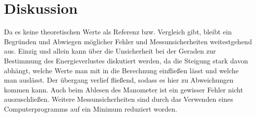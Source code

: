 \section{Diskussion}
\label{sec:Diskussion}
Da es keine theoretischen Werte als Referenz bzw. Vergleich gibt, bleibt ein Begründen und Abwiegen möglicher Fehler und 
Messunsicherheiten weitestgehend aus.
Einzig und allein kann über die Unsicherheit bei der Geraden zur Bestimmung des Energieverlustes diskutiert werden,
da die Steigung stark davon abhängt, welche Werte man mit in die Berechnung einfließen lässt und welche man auslässt.
Der übergang verlief fließend, sodass es hier zu Abweichungen kommen kann.
Auch beim Ablesen des Manometer ist ein gewisser Fehler nicht auszuschließen. Weitere Messunsicherheiten sind durch das Verwenden eines 
Computerprogramms auf ein Minimum reduziert worden.